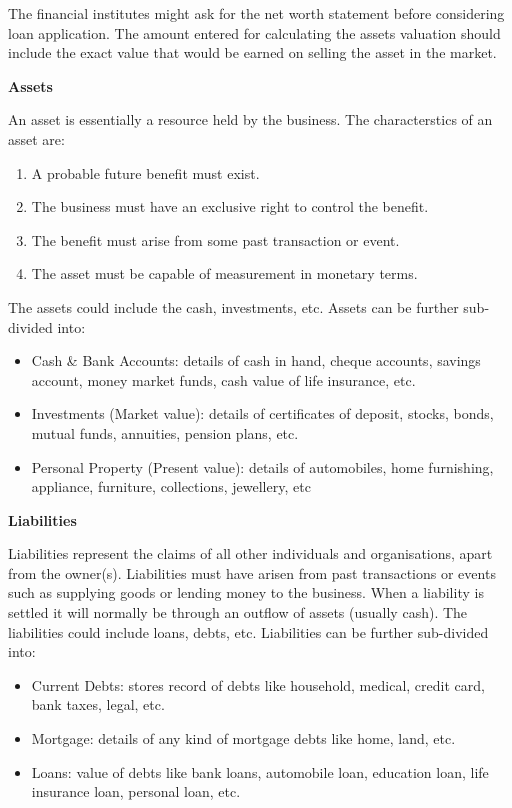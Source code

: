 \documentclass[11pt,]{book}
\providecommand{\tightlist}{%
  \setlength{\itemsep}{0pt}\setlength{\parskip}{0pt}}
\theoremstyle{definition}
\theoremstyle{definition}
\theoremstyle{definition}
\theoremstyle{remark}
\begin{document}
The financial institutes might ask for the net worth statement before
considering loan application. The amount entered for calculating the
assets valuation should include the exact value that would be earned on
selling the asset in the market.

\textbf{Assets}

An asset is essentially a resource held by the business. The
characterstics of an asset are:

\begin{enumerate}
\def\labelenumi{\arabic{enumi}.}
\tightlist
\item
  A probable future benefit must exist.
\item
  The business must have an exclusive right to control the benefit.
\item
  The benefit must arise from some past transaction or event.
\item
  The asset must be capable of measurement in monetary terms.
\end{enumerate}

The assets could include the cash, investments, etc. Assets can be
further sub-divided into:

\begin{itemize}
\tightlist
\item
  Cash \& Bank Accounts: details of cash in hand, cheque accounts,
  savings account, money market funds, cash value of life insurance,
  etc.
\item
  Investments (Market value): details of certificates of deposit,
  stocks, bonds, mutual funds, annuities, pension plans, etc.
\item
  Personal Property (Present value): details of automobiles, home
  furnishing, appliance, furniture, collections, jewellery, etc
\end{itemize}

\textbf{Liabilities}

Liabilities represent the claims of all other individuals and
organisations, apart from the owner(s). Liabilities must have arisen
from past transactions or events such as supplying goods or lending
money to the business. When a liability is settled it will normally be
through an outflow of assets (usually cash). The liabilities could
include loans, debts, etc. Liabilities can be further sub-divided into:

\begin{itemize}
\tightlist
\item
  Current Debts: stores record of debts like household, medical, credit
  card, bank taxes, legal, etc.
\item
  Mortgage: details of any kind of mortgage debts like home, land, etc.
\item
  Loans: value of debts like bank loans, automobile loan, education
  loan, life insurance loan, personal loan, etc.
\end{itemize}
\end{document}
